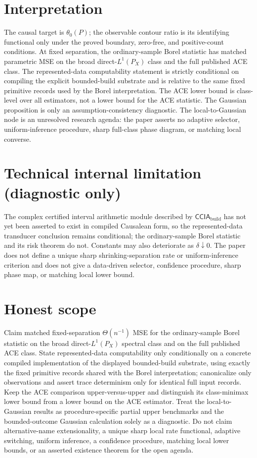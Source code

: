 \documentclass{article}
\begin{document}
\section{Interpretation}

The causal target is \(\theta_0(P)\); the observable contour ratio is its identifying functional only under the proved boundary, zero-free, and positive-count conditions. At fixed separation, the ordinary-sample Borel statistic has matched parametric MSE on the broad direct-\(L^1(P_X)\) class and the full published ACE class. The represented-data computability statement is strictly conditional on compiling the explicit bounded-build substrate and is relative to the same fixed primitive records used by the Borel interpretation. The ACE lower bound is class-level over all estimators, not a lower bound for the ACE statistic. The Gaussian proposition is only an assumption-consistency diagnostic. The local-to-Gaussian node is an unresolved research agenda: the paper asserts no adaptive selector, uniform-inference procedure, sharp full-class phase diagram, or matching local converse.

\section*{Technical internal limitation (diagnostic only)}

The complex certified interval arithmetic module described by \(\mathsf{CCIA}_{\mathrm{build}}\) has not yet been asserted to exist in compiled Causalean form, so the represented-data transducer conclusion remains conditional; the ordinary-sample Borel statistic and its risk theorem do not. Constants may also deteriorate as \(\delta\downarrow0\). The paper does not define a unique sharp shrinking-separation rate or uniform-inference criterion and does not give a data-driven selector, confidence procedure, sharp phase map, or matching local lower bound.

\section{Honest scope}

Claim matched fixed-separation \(\Theta(n^{-1})\) MSE for the ordinary-sample Borel statistic on the broad direct-\(L^1(P_X)\) spectral class and on the full published ACE class. State represented-data computability only conditionally on a concrete compiled implementation of the displayed bounded-build substrate, using exactly the fixed primitive records shared with the Borel interpretation; canonicalize only observations and assert trace determinism only for identical full input records. Keep the ACE comparison upper-versus-upper and distinguish its class-minimax lower bound from a lower bound on the ACE estimator. Treat the local-to-Gaussian results as procedure-specific partial upper benchmarks and the bounded-outcome Gaussian calculation solely as a diagnostic. Do not claim alternative-name extensionality, a unique sharp local rate functional, adaptive switching, uniform inference, a confidence procedure, matching local lower bounds, or an asserted existence theorem for the open agenda.
\end{document}
